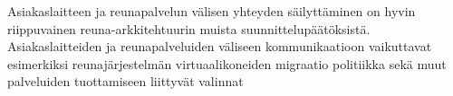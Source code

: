 Asiakaslaitteen ja reunapalvelun välisen yhteyden säilyttäminen on hyvin riippuvainen reuna-arkkitehtuurin muista suunnittelupäätöksistä. Asiakaslaitteiden ja reunapalveluiden väliseen kommunikaatioon vaikuttavat esimerkiksi reunajärjestelmän virtuaalikoneiden migraatio politiikka sekä muut palveluiden tuottamiseen liittyvät valinnat








